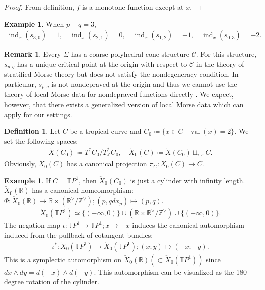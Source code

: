 \documentclass[a4paper,dvipdfmx,reqno,12pt]{amsart}
\theoremstyle{definition}
\newtheorem{definition}[theorem]{Definition}
\newtheorem{example}[theorem]{Example}
\newtheorem{remark}[theorem]{Remark}
\newcommand{\deq}{\coloneqq}
\newcommand{\Z}{\mathbb{Z}}%
\newcommand{\opn}[1]{\operatorname{#1}}
\numberwithin{equation}{section}
\begin{document}
\begin{proof}
From definition, $f$ is a monotone function except 
at $x$.
\end{proof}

\begin{example}
When $p+q=3$, 
\begin{align}
\opn{ind}_x(s_{3,0})=1, \quad 
\opn{ind}_x(s_{2,1})=0, \quad \opn{ind}_x(s_{1,2})=-1, 
\quad \opn{ind}_x(s_{0,3})=-2.
\end{align}
\end{example}

\begin{remark}
\label{remark-nondeprave-curve}
Every $\Sigma$ has a coarse polyhedral cone structure 
$\mathscr{C}$. 
For this structure, $s_{p,q}$ has a unique critical 
point at the origin with respect to 
$\mathscr{C}$ in the theory of stratified 
Morse theory \cite[Part I.2.1]{MR932724}
but does not satisfy the nondegeneracy condition.
In particular, $s_{p,q}$ is not nondepraved 
at the origin \cite[Part I.2.3.]{MR932724} 
and thus we cannot use the theory of local Morse 
data for nondepraved functions directly 
\cite[Part I.3.5.2 Definition]{MR932724}. 
We expect, however, that there exists a 
generalized version of local Morse data 
which can apply for our settings.
\end{remark}

\begin{definition}
\label{definition-continuous-section}
Let $C$ be a tropical curve and 
$C_{0}\deq \{x\in C\mid \opn{val}(x)=2\}$.
We set the following spaces:
\begin{align}
\check{X}(C_0)\deq T^{*}C_0/T^{*}_{\Z}C_0, \quad 
\check{X}_0(C)\deq \check{X}(C_0)\sqcup_{i,s}C.
\end{align}
Obviously, $\check{X}_0(C)$ has a canonical projection
$\check{\pi}_C \colon \check{X}_0(C)\to C$.
\end{definition}

\begin{example}
If $C=\mathbb{T}P^{1}$, then 
$\check{X}_0(C_0)$ is just a 
cylinder with infinity length.
$\check{X}_0(\mathbb{R})$ has a canonical homeomorphism:
$\Phi \colon \check{X}_0(\mathbb{R})\to 
\mathbb{R}\times (\mathbb{R}^{\vee}/\mathbb{Z}^{\vee});
(p,q dx_p)\mapsto (p,q)$.
\begin{align}
\check{X}_0(\mathbb{T}P^{1})\simeq 
\{(-\infty,0)\}\cup(\mathbb{R}\times 
\mathbb{R}^{\vee}/\mathbb{Z}^{\vee})
\cup \{(+\infty,0)\}.
\end{align}
The negation map
$\iota \colon\mathbb{T}P^{1}\to \mathbb{T}P^{1}; x\mapsto -x$
induces the canonical automorphism induced from the pullback of cotangent bundles:
\begin{align}
\iota^{*}\colon \check{X}_0(\mathbb{T}P^{1})
\to \check{X}_0(\mathbb{T}P^{1}); (x;y)\mapsto (-x;-y). 
\end{align}
This is a symplectic automorphism on 
$\check{X}_0(\mathbb{R}) (\subset \check{X}_0(\mathbb{T}P^{1}))$ since 
$dx\wedge dy=d(-x)\wedge d(-y)$.
This automorphism can be visualized as the 180-degree rotation of the 
cylinder.
\end{example}
\end{document}

